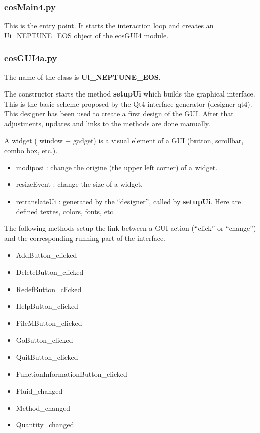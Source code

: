 \documentclass[10pt,a4paper]{article}
\begin{document}
\subsubsection{eosMain4.py}

This is the entry point. It starts the interaction loop and creates an Ui\_NEPTUNE\_EOS object of the eosGUI4 module.

\subsubsection{eosGUI4a.py}

The name of the class is \textbf{Ui\_NEPTUNE\_EOS}.

The constructor starts the method \textbf{setupUi} which builds the graphical interface. This is the basic scheme proposed by the Qt4 interface generator (designer-qt4). This designer has been used to create a first design of the GUI. After that adjustments, updates and links to the methods are done manually. 

A widget ( window + gadget) is a visual element of a GUI (button, scrollbar, combo box, etc.).

\begin{itemize}
\item modiposi : change the origine (the upper left corner) of a widget.
\item resizeEvent : change the size of a widget.
\item retranslateUi : generated by the ``designer'', called by \textbf{setupUi}. Here are defined textes, colors, fonts, etc.
\end{itemize}

The following methods setup the link between a GUI action (``click'' or ``change'') and the corresponding running part of the interface.

\begin{itemize}
\item AddButton\_clicked
\item DeleteButton\_clicked
\item RedefButton\_clicked
\item HelpButton\_clicked
\item FileMButton\_clicked
\item GoButton\_clicked
\item QuitButton\_clicked
\item FunctionInformationButton\_clicked
\item Fluid\_changed
\item Method\_changed
\item Quantity\_changed
\end{itemize}
\end{document}
